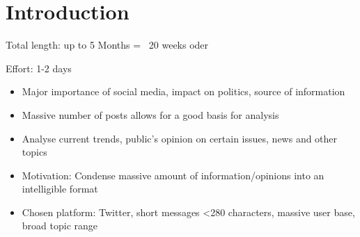 \chapter{Introduction}
\label{cha:Chapter1_Introduction}

Total length: up to 5 Months = ~20 weeks oder

Effort: 1-2 days
\begin{itemize}
\item Major importance of social media, impact on politics, source of information
\item Massive number of posts allows for a good basis for analysis
\item Analyse current trends, public's opinion on certain issues, news and other topics
\item Motivation: Condense massive amount of information/opinions into an intelligible format
\item Chosen platform: Twitter, short messages <280 characters, massive user base, broad topic range
\end{itemize}

